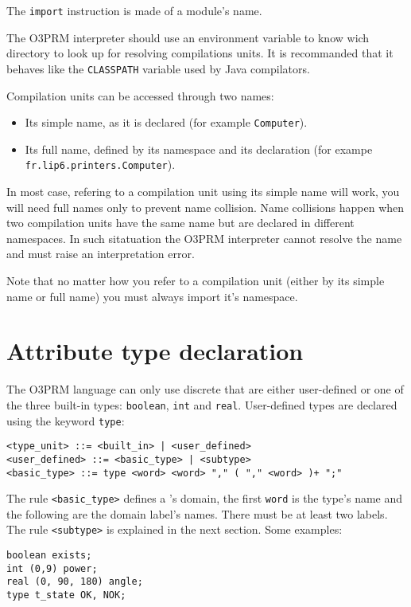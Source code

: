 \documentclass[12pt,a4paper]{article}
\begin{document}
The \verb+import+ instruction is made of a module's name.

The O3PRM interpreter should use an environment variable to know wich directory
to look up for resolving compilations units. It is recommanded that it behaves
like the \verb+CLASSPATH+ variable used by Java compilators.

Compilation units can be accessed through two names:
\begin{itemize}
\item Its simple name, as it is declared (for example \verb+Computer+).
\item Its full name, defined by its namespace and its declaration (for exampe
\verb+fr.lip6.printers.Computer+).
\end{itemize}
In most case, refering to a compilation unit using its simple name will work,
you will need full names only to prevent name collision. Name collisions happen
when two compilation units have the same name but are declared in different
namespaces. In such sitatuation the O3PRM interpreter cannot resolve the name
and must raise an interpretation error.

Note that no matter how you refer to a compilation unit (either by its simple
name or full name) you must always import it's namespace.

\section{Attribute type declaration}

The O3PRM language can only use discrete \rvs{} that are either user-defined or
one of the three built-in types: \verb+boolean+, \verb+int+ and \verb+real+.
User-defined types are declared using the keyword \verb+type+:

\begin{footnotesize}
\begin{verbatim}
<type_unit> ::= <built_in> | <user_defined>
<user_defined> ::= <basic_type> | <subtype>
<basic_type> ::= type <word> <word> "," ( "," <word> )+ ";"
\end{verbatim}
\end{footnotesize}

The rule \verb+<basic_type>+ defines a \rv{}'s domain, the first \verb+word+
is the type's name and the following are the domain label's names. There must
be at least two labels. The rule \verb+<subtype>+ is explained in the
next section. Some examples:

\begin{footnotesize}
\begin{verbatim}
boolean exists;
int (0,9) power;
real (0, 90, 180) angle;
type t_state OK, NOK;
\end{verbatim}
\end{footnotesize}
\end{document}

